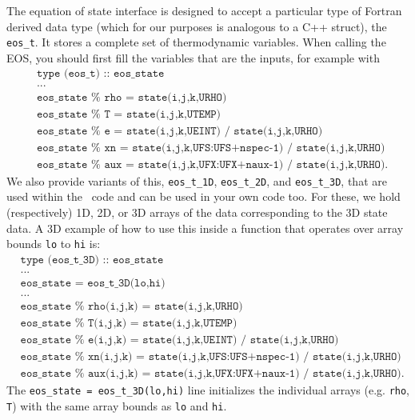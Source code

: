 The equation of state interface is designed to accept a particular 
type of Fortran derived data type (which for our purposes is analogous
to a C++ struct), the {\tt eos\_t}. It stores a complete set of thermodynamic
variables. When calling the EOS, you should first fill the variables
that are the inputs, for example with
\begin{align*}
  &\texttt{type (eos\_t) :: eos\_state} \\
  &\texttt{...} \\
  &\texttt{eos\_state } \% \texttt{ rho = state(i,j,k,URHO)} \\
  &\texttt{eos\_state } \% \texttt{ T   = state(i,j,k,UTEMP)} \\
  &\texttt{eos\_state } \% \texttt{ e   = state(i,j,k,UEINT) / state(i,j,k,URHO)} \\
  &\texttt{eos\_state } \% \texttt{ xn  = state(i,j,k,UFS:UFS+nspec-1) / state(i,j,k,URHO)} \\
  &\texttt{eos\_state } \% \texttt{ aux = state(i,j,k,UFX:UFX+naux-1) / state(i,j,k,URHO)}.
\end{align*}
We also provide variants of this, {\tt eos\_t\_1D}, {\tt eos\_t\_2D}, and {\tt eos\_t\_3D}, 
that are used within the \castro\ code and can be used in your own code too. For these,
we hold (respectively) 1D, 2D, or 3D arrays of the data corresponding to the 3D state data. 
A 3D example of how to use this inside a function that operates over array bounds {\tt lo} to 
{\tt hi} is:
\begin{align*}
  &\texttt{type (eos\_t\_3D) :: eos\_state} \\
  &\texttt{...} \\
  &\texttt{eos\_state = eos\_t\_3D(lo,hi)} \\
  &\texttt{...} \\
  &\texttt{eos\_state } \% \texttt{ rho(i,j,k) = state(i,j,k,URHO)} \\
  &\texttt{eos\_state } \% \texttt{ T(i,j,k)   = state(i,j,k,UTEMP)} \\
  &\texttt{eos\_state } \% \texttt{ e(i,j,k)   = state(i,j,k,UEINT) / state(i,j,k,URHO)} \\
  &\texttt{eos\_state } \% \texttt{ xn(i,j,k)  = state(i,j,k,UFS:UFS+nspec-1) / state(i,j,k,URHO)} \\
  &\texttt{eos\_state } \% \texttt{ aux(i,j,k) = state(i,j,k,UFX:UFX+naux-1) / state(i,j,k,URHO)}.
\end{align*}
The \texttt{eos\_state = eos\_t\_3D(lo,hi)} line initializes the individual arrays (e.g. {\tt rho}, {\tt T})
with the same array bounds as {\tt lo} and {\tt hi}.

